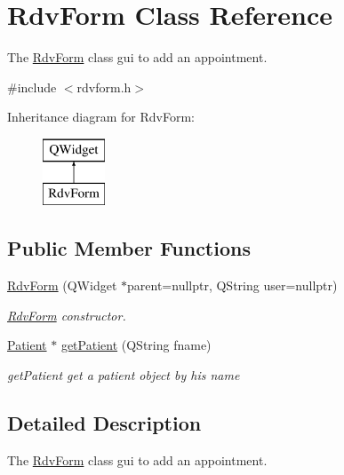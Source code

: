 \hypertarget{class_rdv_form}{}\section{Rdv\+Form Class Reference}
\label{class_rdv_form}


The \mbox{\hyperlink{class_rdv_form}{Rdv\+Form}} class gui to add an appointment.  




{\ttfamily \#include $<$rdvform.\+h$>$}

Inheritance diagram for Rdv\+Form\+:\begin{figure}[H]
\begin{center}
\leavevmode
\includegraphics[height=2.000000cm]{class_rdv_form}
\end{center}
\end{figure}
\subsection*{Public Member Functions}
\begin{DoxyCompactItemize}
\item 
\mbox{\hyperlink{class_rdv_form_a26f5f247bfffe65ca85e2f2e8d769c8a}{Rdv\+Form}} (Q\+Widget $\ast$parent=nullptr, Q\+String user=nullptr)
\begin{DoxyCompactList}\small\item\em \mbox{\hyperlink{class_rdv_form}{Rdv\+Form}} constructor. \end{DoxyCompactList}\item 
\mbox{\hyperlink{class_patient}{Patient}} $\ast$ \mbox{\hyperlink{class_rdv_form_aee1f52f10a74e3c307e28d838408afda}{get\+Patient}} (Q\+String fname)
\begin{DoxyCompactList}\small\item\em get\+Patient get a patient object by his name \end{DoxyCompactList}\end{DoxyCompactItemize}


\subsection{Detailed Description}
The \mbox{\hyperlink{class_rdv_form}{Rdv\+Form}} class gui to add an appointment. 

